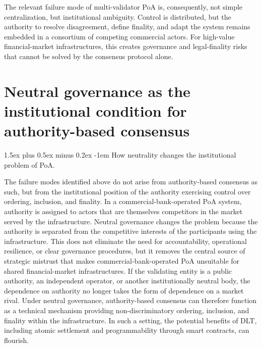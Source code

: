 \documentclass[
reprint,
showkeys,
superscriptaddress,
aps,
pra,
longbibliography,
nofootinbib,
]{revtex4-2}
\makeatletter
\theoremstyle{definition}\newtheorem{definition}{Definition}
\renewcommand\paragraph{%
	\@startsection{paragraph}{4}{\z@}%
	{1.5ex plus 0.5ex minus 0.2ex}%
	{-1em}%
	{\normalfont\normalsize\bfseries}%
}
\makeatother
\begin{document}
The relevant failure mode of multi-validator PoA is, consequently, not simple centralization, but institutional ambiguity.
Control is distributed, but the authority to resolve disagreement, define finality, and adapt the system remains embedded in a consortium of competing commercial actors.
For high-value financial-market infrastructures, this creates governance and legal-finality risks that cannot be solved by the consensus protocol alone.


\section{Neutral governance as the institutional condition for authority-based consensus}
\label{sec:neutral-governance}


\paragraph{How neutrality changes the institutional problem of PoA.}

The failure modes identified above do not arise from authority-based consensus as such, but from the institutional position of the authority exercising control over ordering, inclusion, and finality. 
In a commercial-bank-operated PoA system, authority is assigned to actors that are themselves competitors in the market served by the infrastructure. Neutral governance changes the problem because the authority is separated from the competitive interests of the participants using the infrastructure. This does not eliminate the need for accountability, operational resilience, or clear governance procedures, but it removes the central source of strategic mistrust that makes commercial-bank-operated PoA unsuitable for shared financial-market infrastructures.
If the validating entity is a public authority, an independent operator, or another institutionally neutral body, the dependence on authority no longer takes the form of dependence on a market rival.
Under neutral governance, authority-based consensus can therefore function as a technical mechanism providing non-discriminatory ordering, inclusion, and finality within the infrastructure.
In such a setting, the potential benefits of DLT, including atomic settlement and programmability through smart contracts, can flourish.
\end{document}
